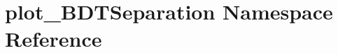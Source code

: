 \hypertarget{namespaceplot__BDTSeparation}{
\section{plot\_\-BDTSeparation Namespace Reference}
\label{namespaceplot__BDTSeparation}
}
